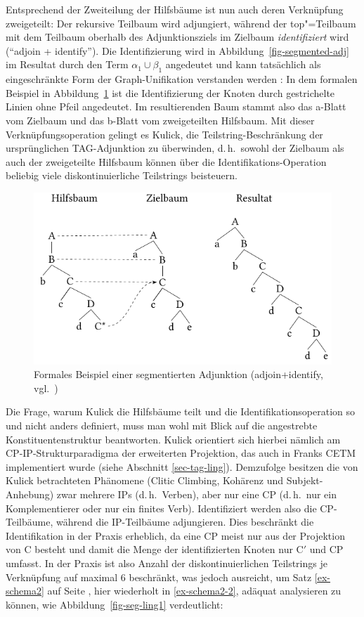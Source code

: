 Entsprechend der Zweiteilung der Hilfsbäume ist nun auch deren Verknüpfung zweigeteilt: Der rekursive Teilbaum wird adjungiert, während der top"=Teilbaum mit dem Teilbaum oberhalb des Adjunktionsziels im Zielbaum {\it identifiziert}  wird ("`adjoin + identify"'). Die Identifizierung wird in Abbildung~\ref{fig-segmented-adj} im Resultat durch den Term $\alpha_1 \cup \beta_1$ angedeutet und kann tatsächlich als eingeschränkte Form der Graph-Unifikation verstanden werden \citep[93f]{Kulick:00}: In dem formalen Beispiel in Abbildung~\ref{fig-seg-formal} ist die Identifizierung der Knoten durch gestrichelte Linien ohne Pfeil angedeutet. Im resultierenden Baum stammt also das a-Blatt vom Zielbaum und das b-Blatt vom zweigeteilten Hilfsbaum. Mit dieser Verknüpfungsoperation gelingt es Kulick, die Teilstring-Beschränkung der ursprünglichen TAG-Adjunktion zu überwinden, d.\,h.\ sowohl der Zielbaum als auch der zweigeteilte Hilfsbaum können über die Identifikations-Operation beliebig viele diskontinuierliche Teilstrings beisteuern. 

\begin{figure}[t] 
\centering
\includegraphics{graphics/abb612.pdf}
\caption{Formales Beispiel einer segmentierten Adjunktion (adjoin+identify, vgl.\ \citealt[(145), (146)]{Kulick:00})\label{fig-seg-formal}}
\end{figure} 
 
Die Frage, warum Kulick die Hilfsbäume teilt und die Identifikationsoperation so und nicht anders definiert, muss man wohl mit Blick auf die angestrebte Konstituentenstruktur beantworten. Kulick orientiert sich hierbei nämlich am CP-IP-Strukturparadigma der erweiterten Projektion, das auch in Franks CETM implementiert wurde (siehe Abschnitt \ref{sec-tag-ling}). Demzufolge besitzen die von Kulick betrachteten Phänomene (Clitic Climbing, Kohärenz und Subjekt-Anhebung) zwar mehrere IPs (d.\,h.\ Verben), aber nur eine CP (d.\,h.\ nur ein Komplementierer oder nur ein finites Verb). Identifiziert werden also die CP-Teilbäume, während die IP-Teilbäume adjungieren. Dies beschränkt die Identifikation in der Praxis erheblich, da eine CP meist nur aus der Projektion von C besteht und damit die Menge der identifizierten Knoten nur C$'$ und CP umfasst. In der Praxis ist also Anzahl der diskontinuierlichen Teilstrings je Verknüpfung auf maximal 6 beschränkt, was jedoch ausreicht, um Satz \ref{ex-schema2} auf Seite \pageref{ex-schema2}, hier wiederholt in \ref{ex-schema2-2}, adäquat analysieren zu können, wie Abbildung~\ref{fig-seg-ling1} verdeutlicht:
\largerpage%

